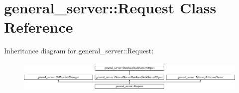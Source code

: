 \hypertarget{classgeneral__server_1_1Request}{\section{general\-\_\-server\-:\-:\-Request \-Class \-Reference}
\label{classgeneral__server_1_1Request}
}
\-Inheritance diagram for general\-\_\-server\-:\-:\-Request\-:\begin{figure}[H]
\begin{center}
\leavevmode
\includegraphics[height=1.573034cm]{classgeneral__server_1_1Request}
\end{center}
\end{figure}
